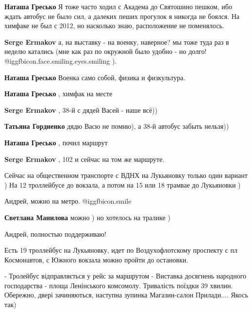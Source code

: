 \begin{itemize}
\begin{itemize}
\begin{itemize} %

\textbf{Наташа Гресько} Я тоже часто ходил с Академа до Святошино пешком, ибо ждать автобус не было сил, а далеких пеших прогулок я никогда не боялся.
На химфаке не был с 2012, но насколько знаю, расположение не поменялось.

\textbf{Serge Ermakov} а, на выставку - на военку, наверное? мы тоже туда раз в неделю катались (мне как раз по окружной было удобно - но долго! @igg{fbicon.face.smiling.eyes.smiling} ).


\textbf{Наташа Гресько} Военка само собой, физика и физкультура.

\textbf{Наташа Гресько} , химфак на месте
\end{itemize} %

\textbf{Serge Ermakov} , 38-й с дядей Васей - наше всё))

\textbf{Татьяна Гордиенко} дядю Васю не помню), а 38-й автобус забыть нельзя))

\textbf{Наташа Гресько} , почил маршрут

\textbf{Serge Ermakov} , 102 и сейчас на том же маршруте.

\end{itemize} %


Сейчас на общественном транспорте с ВДНХ на Лукьяновку только один вариант ) На
12 троллейбусе до вокзала, а потом на 15 или 18 трамвае до Лукьяновки )

\begin{itemize} %
Андрей, можно на метро. @igg{fbicon.smile} 

\textbf{Светлана Манилова} можно ) но хотелось на тралике )

Андрей, полностью поддерживаю!

Есть 19 троллейбус на Лукьяновку, идет по Воздухофлотскому проспекту с пл Космонавтов, с Южного вокзала можно пройти до остановки.
\end{itemize} %

- Тролейбус відправляється у рейс за маршрутом - Виставка досягнень народного господарства - площа Ленінського комсомолу. Тривалість поїздки 39 хвилин. Обережно, двері зачиняються, наступна зупинка Магазин-салон Прилади....
Якось так)


\end{itemize}
